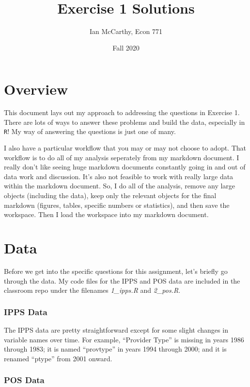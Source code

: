 \documentclass[
  12pt,
]{article}
\title{Exercise 1 Solutions}
\author{Ian McCarthy, Econ 771}
\date{Fall 2020}
\begin{document}
\maketitle


\hypertarget{overview}{%
\section{Overview}\label{overview}}

This document lays out my approach to addressing the questions in Exercise 1. There are lots of ways to answer these problems and build the data, especially in \texttt{R}! My way of answering the questions is just one of many.

I also have a particular workflow that you may or may not choose to adopt. That workflow is to do all of my analysis seperately from my markdown document. I really don't like seeing huge markdown documents constantly going in and out of data work and discussion. It's also not feasible to work with really large data within the markdown document. So, I do all of the analysis, remove any large objects (including the data), keep only the relevant objects for the final markdown (figures, tables, specific numbers or statistics), and then save the workspace. Then I load the workspace into my markdown document.

\hypertarget{data}{%
\section{Data}\label{data}}

Before we get into the specific questions for this assignment, let's briefly go through the data. My code files for the IPPS and POS data are included in the classroom repo under the filenames \emph{1\_ipps.R} and \emph{2\_pos.R}.

\hypertarget{ipps-data}{%
\subsubsection{IPPS Data}\label{ipps-data}}

The IPPS data are pretty straightforward except for some slight changes in variable names over time. For example, ``Provider Type'' is missing in years 1986 through 1983; it is named ``provtype'' in years 1994 through 2000; and it is renamed ``ptype'' from 2001 onward.

\hypertarget{pos-data}{%
\subsubsection{POS Data}\label{pos-data}}
\end{document}
